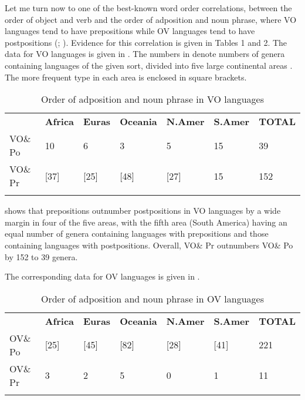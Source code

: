 \documentclass[output=paper]{langsci/langscibook}
\begin{document}
Let me turn now to one of the best-known word order correlations, between the order of object and verb and the order of adposition and noun phrase, where VO languages tend to have prepositions while OV languages tend to have postpositions (\citealt{Greenberg1963}; \citealt{Dryer1992}). Evidence for this correlation is given in Tables 1 and 2. The data for VO languages is given in . The numbers in  denote numbers of genera containing languages of the given sort, divided into five large continental areas \citep{Dryer1989}. The more frequent type in each area is enclosed in square brackets.

\begin{table}
\begin{tabularx}{\textwidth}{XXXXXXX} 
\lsptoprule
& \bfseries Africa & \bfseries Euras & \bfseries Oceania & \bfseries N.Amer & \bfseries S.Amer & \bfseries TOTAL\\
VO\& Po & 10 & 6 & 3 & 5 & 15 & 39\\
VO\& Pr & [37] & [25] & [48] & [27] & 15 & 152\\
\lspbottomrule
\end{tabularx}
\caption{\label{tab:dryer:1}Order of adposition and noun phrase in VO languages}
\end{table}



 shows that prepositions outnumber postpositions in VO languages by a wide margin in four of the five areas, with the fifth area (South America) having an equal number of genera containing languages with prepositions and those containing languages with postpositions. Overall, VO\& Pr outnumbers VO\& Po by 152 to 39 genera.

The corresponding data for OV languages is given in .

\begin{table}
\begin{tabularx}{\textwidth}{XXXXXXX} 
\lsptoprule
& \bfseries Africa & \bfseries Euras & \bfseries Oceania & \bfseries N.Amer & \bfseries S.Amer & \bfseries TOTAL\\
OV\& Po & [25] & [45] & [82] & [28] & [41] & 221\\
OV\& Pr & 3 & 2 & 5 & 0 & 1 & 11\\
\lspbottomrule
\end{tabularx}
\caption{\label{tab:dryer:2}Order of adposition and noun phrase in OV languages}
\end{table}
\end{document}
